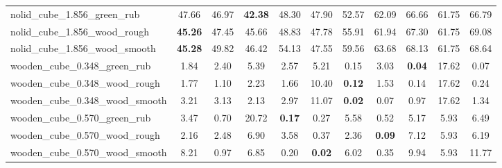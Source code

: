 \begin{table}[H]
{\begin{tabular}{l cccccccccc}
        nolid\_cube\_1.856\_green\_rub & 47.66 & 46.97 & \textbf{42.38} & 48.30 & 47.90 & 52.57 & 62.09 & 66.66 & 61.75 & 66.79 \\
        nolid\_cube\_1.856\_wood\_rough & \textbf{45.26} & 47.45 & 45.66 & 48.83 & 47.78 & 55.91 & 61.94 & 67.30 & 61.75 & 69.08 \\
        nolid\_cube\_1.856\_wood\_smooth & \textbf{45.28} & 49.82 & 46.42 & 54.13 & 47.55 & 59.56 & 63.68 & 68.13 & 61.75 & 68.64 \\
        wooden\_cube\_0.348\_green\_rub & 1.84 & 2.40 & 5.39 & 2.57 & 5.21 & 0.15 & 3.03 & \textbf{0.04} & 17.62 & 0.07 \\
        wooden\_cube\_0.348\_wood\_rough & 1.77 & 1.10 & 2.23 & 1.66 & 10.40 & \textbf{0.12} & 1.53 & 0.14 & 17.62 & 0.24 \\
        wooden\_cube\_0.348\_wood\_smooth & 3.21 & 3.13 & 2.13 & 2.97 & 11.07 & \textbf{0.02} & 0.07 & 0.97 & 17.62 & 1.34 \\
        wooden\_cube\_0.570\_green\_rub & 3.47 & 0.70 & 20.72 & \textbf{0.17} & 0.27 & 5.58 & 0.52 & 5.17 & 5.93 & 6.49 \\
        wooden\_cube\_0.570\_wood\_rough & 2.16 & 2.48 & 6.90 & 3.58 & 0.37 & 2.36 & \textbf{0.09} & 7.12 & 5.93 & 6.19 \\
        wooden\_cube\_0.570\_wood\_smooth & 8.21 & 0.97 & 6.85 & 0.20 & \textbf{0.02} & 6.02 & 0.35 & 9.94 & 5.93 & 11.77 \\
        \bottomrule
    \end{tabular}
    }
\end{table}



\vspace{1cm}

\clearpage

